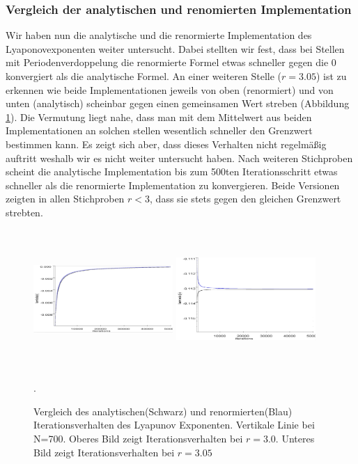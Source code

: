 \documentclass{scrartcl}
\begin{document}
\subsubsection{Vergleich der analytischen und renomierten Implementation}
Wir haben nun die analytische und die renormierte Implementation des Lyaponovexponenten weiter untersucht. Dabei stellten wir fest, dass bei Stellen mit Periodenverdoppelung die renormierte Formel etwas schneller gegen die 0 konvergiert als die analytische Formel. An einer weiteren Stelle ($r=3.05$) ist zu erkennen wie beide Implementationen jeweils von oben (renormiert) und von unten (analytisch) scheinbar gegen einen gemeinsamen Wert streben (Abbildung \ref{fig:lyapunov-compare}). Die Vermutung liegt nahe, dass man mit dem Mittelwert aus beiden Implementationen an solchen stellen wesentlich schneller den Grenzwert bestimmen kann. Es zeigt sich aber, dass dieses Verhalten nicht regelmäßig auftritt weshalb wir es nicht weiter untersucht haben. Nach weiteren Stichproben scheint die analytische Implementation bis zum 500ten Iterationsschritt etwas schneller als die renormierte Implementation zu konvergieren. Beide Versionen zeigten in allen Stichproben $r<3$, dass sie stets gegen den gleichen Grenzwert strebten.
\begin{figure}
\centering
\includegraphics[width=200px, height=200px]{lyapunov-analysis-300}
\includegraphics[width=200px, height=200px]{lyapunov-analysis-305}
\caption{Vergleich des analytischen(Schwarz) und renormierten(Blau) Iterationsverhalten des Lyapunov Exponenten. Vertikale Linie bei N=700. Oberes Bild zeigt Iterationsverhalten bei $r=3.0$. Unteres Bild zeigt Iterationsverhalten bei $r=3.05$ }. 
\label{fig:lyapunov-compare}
\end{figure}
\end{document}

